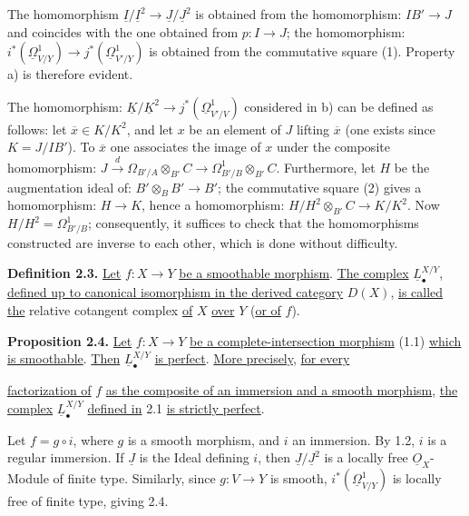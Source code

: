The homomorphism $\underline{I}/\underline{I}^2\to\underline{J}/\underline{J}^2$ is obtained from the homomorphism: $IB'\to J$ and coincides with the one obtained from $p:I\to J$; the homomorphism: $i^*(\underline{\Omega}^1_{V/Y})\longrightarrow j^*(\underline{\Omega}^1_{V'/Y})$ is obtained from the commutative square (1). Property a) is therefore evident.

The homomorphism: $\underline{K}/\underline{K}^2\to j^*(\underline{\Omega}^1_{V'/V})$ considered in b) can be defined as follows: let $\overline x\in K/K^2$, and let $x$ be an element of $J$ lifting $\overline x$ (one exists since $K=J/IB'$). To $\overline x$ one associates the image of $x$ under the composite homomorphism: $J\xrightarrow{d}\Omega_{B'/A}\otimes_{B'}C\longrightarrow\Omega^1_{B'/B}\otimes_{B'}C$. Furthermore, let $H$ be the augmentation ideal of: $B'\otimes_B B'\longrightarrow B'$; the commutative square (2) gives a homomorphism: $H\to K$, hence a homomorphism: $H/H^2\otimes_{B'}C\longrightarrow K/K^2$. Now $H/H^2=\Omega^1_{B'/B}$; consequently, it suffices to check that the homomorphisms constructed are inverse to each other, which is done without difficulty.

\textbf{Definition 2.3.} \uline{Let} $f:X\to Y$ \uline{be a smoothable morphism}. \uline{The complex} $\underline{L}^{X/Y}_\bullet$, \uline{defined up to canonical isomorphism in the derived category} $D(X)$, \uline{is called the} relative cotangent complex \uline{of} $X$ \uline{over} $Y$ (\uline{or of} $f$).

\textbf{Proposition 2.4.} \uline{Let} $f:X\to Y$ \uline{be a complete-intersection morphism} (1.1) \uline{which is smoothable}. \uline{Then} $\underline{L}^{X/Y}_\bullet$ \uline{is perfect}. \uline{More precisely}, \uline{for every}

%
\uline{factorization of} $f$ \uline{as the composite of an immersion and a smooth morphism}, \uline{the complex} $\underline{L}^{X/Y}_\bullet$ \uline{defined in} 2.1 \uline{is strictly perfect}.

Let $f=g\circ i$, where $g$ is a smooth morphism, and $i$ an immersion. By 1.2, $i$ is a regular immersion. If $\underline{J}$ is the Ideal defining $i$, then $\underline{J}/\underline{J}^2$ is a locally free $\underline{O}_X$-Module of finite type. Similarly, since $g:V\to Y$ is smooth, $i^*(\underline{\Omega}^1_{V/Y})$ is locally free of finite type, giving 2.4.


